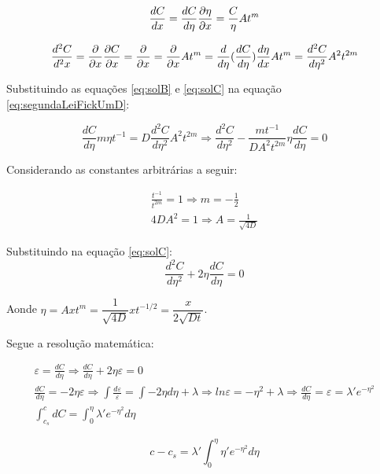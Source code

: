 \documentclass[]{politex}
\begin{document}
\begin{equation} \label{eq:solB}
 \frac{dC}{dx} = \frac{dC}{d\eta}\pdv{\eta}{x} = \frac{C}{\eta}At^m
\end{equation}

\begin{equation} \label{eq:solC}
 \frac{d^2C}{d^2x} = \pdv{}{x}\pdv{C}{x} = \pdv{}{x}(\frac{dC}{d\eta}At^m) = \pdv{}{x}(\frac{dC}{d\eta})At^m = \frac{d}{d\eta}(\frac{dC}{d\eta})\frac{d\eta}{dx}At^m = \frac{d^2C}{d\eta ^2}A^2t^{2m}
\end{equation}

Substituindo as equações \autoref{eq:solB} e \autoref{eq:solC} na equação \autoref{eq:segundaLeiFickUmD}:

\begin{equation} \label{eq:solD}
 \frac{dC}{d\eta}m\eta t^{-1} = D \frac{d^2C}{d\eta ^2}A^2t^{2m} \Rightarrow \frac{d^2C}{d\eta ^2} - \frac{mt^{-1}}{DA^2t^{2m}}\eta \frac{dC}{d\eta} = 0 
\end{equation}

Considerando as constantes arbitrárias a seguir:

\begin{gather*}		
	\frac{t^{-1}}{t^{2m}} = 1 \Rightarrow m = -\frac{1}{2} \\
	4DA^2 = 1 \Rightarrow A = \frac{1}{\sqrt{4D}}
\end{gather*}	

Substituindo na equação \autoref{eq:solC}:
\begin{equation} \label{eq:solE}
 \frac{d^2C}{d\eta ^2} + 2\eta \frac{dC}{d\eta} = 0
\end{equation}

Aonde $\eta = Axt^m = \dfrac{1}{\sqrt{4D}}xt^{-1/2} = \dfrac{x}{2\sqrt{Dt}}$.

Segue a resolução matemática:

\begin{gather*}		
	\varepsilon = \frac{dC}{d\eta} \Rightarrow \frac{dC}{d\eta} + 2\eta\varepsilon = 0 \\
	\frac{dC}{d\eta} = -2\eta\varepsilon \Rightarrow \int\frac{d\varepsilon}{\varepsilon} = \int -2\eta d\eta + \lambda \Rightarrow ln\varepsilon = -\eta^2 + \lambda \Rightarrow \frac{dC}{d\eta} = \varepsilon = \lambda'e^{-\eta^2} \\
	\int_{c_s}^{c} dC = \int_{0}^{\eta} \lambda'e^{-\eta^2} d\eta 
\end{gather*}	

\begin{equation} \label{eq:solF}
	c - c_s =  \lambda'\int_{0}^{\eta} \eta'e^{-\eta^2} d\eta 
\end{equation}
\end{document}
